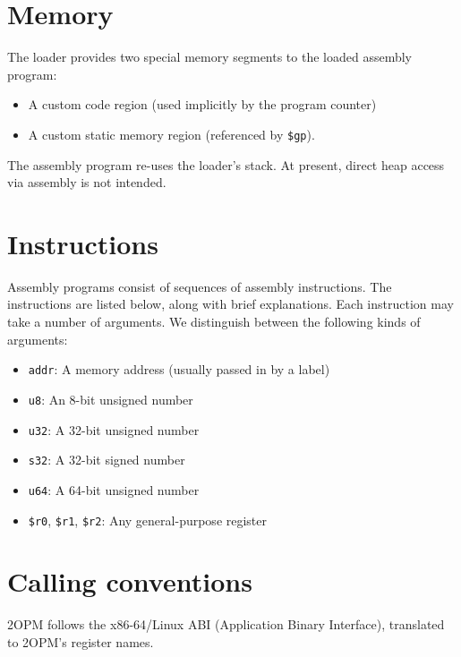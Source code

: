 \documentclass{article}
\begin{document}
\section{Memory}
The loader provides two special memory segments to the loaded assembly program:
\begin{itemize}
\item A custom code region (used implicitly by the program counter)
\item A custom static memory region (referenced by \texttt{\$gp}).
\end{itemize}
The assembly program re-uses the loader's stack.  At present, direct heap access via assembly is not intended.

\section{Instructions}

Assembly programs consist of sequences of assembly instructions.  The instructions are listed below, along with brief explanations.
Each instruction may take a number of arguments.  We distinguish between the following kinds of arguments:
\begin{itemize}
  \item \texttt{addr}: A memory address (usually passed in by a label)
  \item \texttt{u8}: An 8-bit unsigned number
  \item \texttt{u32}: A 32-bit unsigned number
  \item \texttt{s32}: A 32-bit signed number
  \item \texttt{u64}: A 64-bit unsigned number
  \item \texttt{\$r0}, \texttt{\$r1}, \texttt{\$r2}: Any general-purpose register
\end{itemize}


\newpage
{}

\section{Calling conventions}

2OPM follows the x86-64/Linux ABI (Application Binary Interface), translated to 2OPM's register names.
\end{document}

